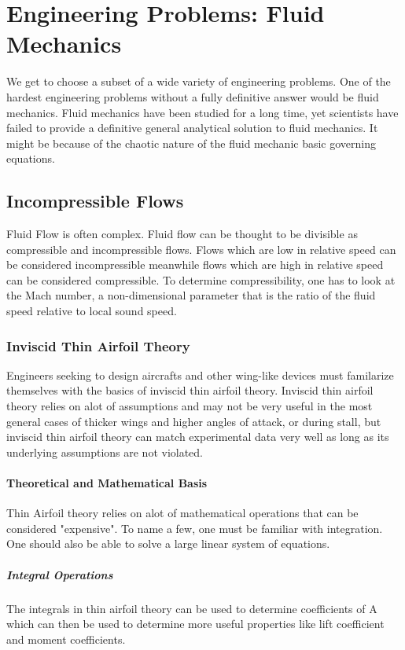 \documentclass[a4paper, 12pt]{report}
\begin{document}
\tableofcontents

\part{Engineering Problems: Fluid Mechanics}
We get to choose a subset of a wide variety of engineering problems. One of the hardest engineering problems without a fully definitive answer would be fluid mechanics. Fluid mechanics have been studied for a long time, yet scientists have failed to provide a definitive general analytical solution to fluid mechanics. It might be because of the chaotic nature of the fluid mechanic basic governing equations.

\chapter{Incompressible Flows}
Fluid Flow is often complex. Fluid flow can be thought to be divisible as compressible and incompressible flows. Flows which are low in relative speed can be considered incompressible meanwhile flows which are high in relative speed can be considered compressible. To determine compressibility, one has to look at the Mach number, a non-dimensional parameter that is the ratio of the fluid speed relative to local sound speed.

\section{Inviscid Thin Airfoil Theory}
Engineers seeking to design aircrafts and other wing-like devices must familarize themselves with the basics of inviscid thin airfoil theory. Inviscid thin airfoil theory relies on alot of assumptions and may not be very useful in the most general cases of thicker wings and higher angles of attack, or during stall, but inviscid thin airfoil theory can match experimental data very well as long as its underlying assumptions are not violated.

\subsection{Theoretical and Mathematical Basis}
Thin Airfoil theory relies on alot of mathematical operations that can be considered "expensive". To name a few, one must be familiar with integration. One should also be able to solve a large linear system of equations.

\subsubsection{Integral Operations}
The integrals in thin airfoil theory can be used to determine coefficients of A which can then be used to determine more useful properties like lift coefficient and moment coefficients.
\end{document}
